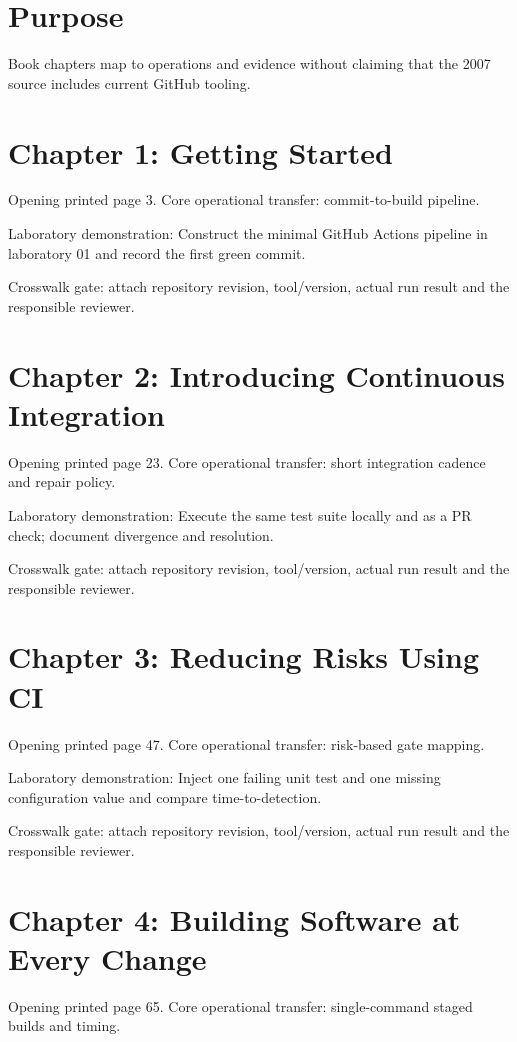 \documentclass[11pt,letterpaper]{article}
\begin{document}
\makedoctitle
\makedocsummary
\tableofcontents
\clearpage
\section{Purpose}
Book chapters map to operations and evidence without claiming that the 2007 source includes current GitHub tooling.

\section{Chapter 1: Getting Started}
Opening printed page 3. Core operational transfer: commit-to-build pipeline.

Laboratory demonstration: Construct the minimal GitHub Actions pipeline in laboratory 01 and record the first green commit.

Crosswalk gate: attach repository revision, tool/version, actual run result and the responsible reviewer.

\section{Chapter 2: Introducing Continuous Integration}
Opening printed page 23. Core operational transfer: short integration cadence and repair policy.

Laboratory demonstration: Execute the same test suite locally and as a PR check; document divergence and resolution.

Crosswalk gate: attach repository revision, tool/version, actual run result and the responsible reviewer.

\section{Chapter 3: Reducing Risks Using CI}
Opening printed page 47. Core operational transfer: risk-based gate mapping.

Laboratory demonstration: Inject one failing unit test and one missing configuration value and compare time-to-detection.

Crosswalk gate: attach repository revision, tool/version, actual run result and the responsible reviewer.

\section{Chapter 4: Building Software at Every Change}
Opening printed page 65. Core operational transfer: single-command staged builds and timing.
\end{document}
